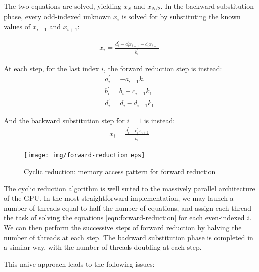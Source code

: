 \documentclass{article}
\begin{document}
        The two equations are solved, yielding $x_N$ and $x_{N/2}$.
        In the backward substitution phase, every odd-indexed unknown $x_i$
        is solved for by substituting the known values of $x_{i-1}$ and $x_{i+1}$:

        \begin{align} \label{eqn:back-substitution}
        x_i = \frac{d^{\prime}_i - a^{\prime}_ix_{i-1} - c^{\prime}_ix_{i+1}}{b^{\prime}_i}
        \end{align}

        At each step, for the last index $i$, the forward reduction step is
        instead:
        \begin{align} \label{eqn:forward-reduction-right}
            & a^{\prime}_i = -a_{i-1}k_1 & \\
            & b^{\prime}_i = b_i - c_{i-1}k_1 & \\
            & d^{\prime}_i = d_i - d_{i-1}k_1 &
        \end{align}

        And the backward substitution step for $i=1$ is instead:
        \begin{align} \label{eqn:back-substitution-right}
        x_i = \frac{d^{\prime}_i - c^{\prime}_ix_{i+1}}{b^{\prime}_i}
        \end{align}

        \begin{figure}[h]
        \begin{center}
        \texttt{[image: img/forward-reduction.eps]}
        \end{center}
        \caption{Cyclic reduction: memory access pattern for forward reduction}
        \label{fig:forward-reduction}
        \end{figure}

        The cyclic reduction algorithm is well suited to the massively
        parallel architecture of the GPU.
        In the most straightforward implementation,
        we may launch a number of threads equal to
        half the number of equations,
        and assign each thread the task of
        solving the equations \ref{eqn:forward-reduction} for each even-indexed
        $i$.
        We can then perform the successive steps of forward reduction
        by halving the number of threads at each step.
        The backward substitution phase is completed in a similar way,
        with the number of threads doubling at each step.

        This naive approach leads to the following issues:
\end{document}
